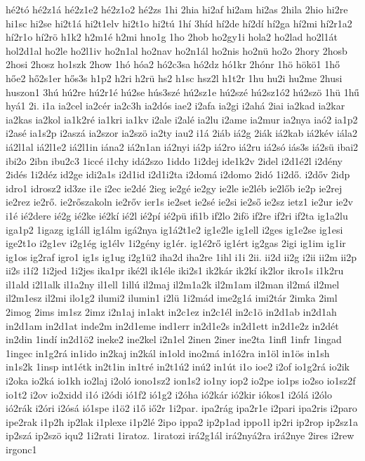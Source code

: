 {hé2tó
hé2z1á
hé2z1e2
hé2z1o2
hé2zs
1hi
2hia
hi2af
hi2am
hi2as
2hila
2hio
hi2re
hi1sc
hi2se
hi2t1á
hi2t1elv
hi2t1o
hi2tú
1hí
3híd
hí2de
hí2dí
hí2ga
hí2mi
hí2r1a2
hí2r1o
hí2rö
h1k2
h2m1é
h2mi
hno1g
1ho
2hob
ho2gy1i
hola2
ho2lad
ho2l1át
hol2d1al
ho2le
ho2l1iv
ho2n1al
ho2nav
ho2n1ál
ho2nis
ho2nü
ho2o
2hory
2hosb
2hosi
2hosz
ho1szk
2how
1hó
hóa2
hó2c3sa
hó2dz
hó1kr
2hónr
1hö
hökö1
1hő
hőe2
hő2s1er
hős3s
h1p2
h2ri
h2rü
hs2
h1sc
hsz2l
h1t2r
1hu
hu2i
hu2me
2husi
huszon1
3hú
hú2re
hú2r1é
hú2se
hús3szé
hú2sz1e
hú2szé
hú2sz1ó2
hú2szö
1hü
1hű
hyá1
2i.
i1a
ia2cel
ia2cér
ia2c3h
ia2dós
iae2
i2afa
ia2gi
i2ahá
2iai
ia2kad
ia2kar
ia2kas
ia2kol
ia1k2ré
ia1kri
ia1kv
i2ale
i2alé
ia2lu
i2ame
ia2mur
ia2nya
iaó2
ia1p2
i2asé
ia1s2p
i2aszá
ia2szor
ia2szö
ia2ty
iau2
i1á
2iáb
iá2g
2iák
iá2kab
iá2kév
iála2
iá2l1al
iá2l1e2
iá2l1in
iána2
iá2n1an
iá2nyi
iá2p
iá2ro
iá2ru
iá2só
iás3s
iá2sü
ibai2
ibi2o
2ibn
ibu2c3
1iccé
i1chy
idá2szo
1iddo
1i2dej
ide1k2v
2idel
i2d1é2l
i2dény
2idés
1i2déz
id2ge
idi2a1s
i2d1id
i2d1i2ta
i2domá
i2domo
2idó
1i2dő.
i2dőv
2idp
idro1
idrosz2
id3ze
i1e
i2ec
ie2dé
2ieg
ie2gé
ie2gy
ie2le
ie2léb
ie2lőb
ie2p
ie2rej
ie2rez
ie2rő.
ie2rőszakoln
ie2rőv
ier1s
ie2set
ie2sé
ie2si
ie2ső
ie2sz
ietz1
ie2ur
ie2v
i1é
ié2dere
ié2g
ié2ke
ié2kí
ié2l
ié2pí
ié2pü
ifi1b
if2lo
2ifö
if2re
if2ri
if2ta
ig1a2lu
iga1p2
1igazg
ig1áll
ig1álm
igá2nya
ig1á2t1e2
ig1e2le
ig1ell
i2ges
ig1e2se
ig1esi
ige2t1o
i2g1ev
i2g1ég
ig1élv
1i2gény
ig1ér.
ig1é2rő
ig1ért
ig2gas
2igi
ig1im
ig1ir
ig1os
ig2raf
igro1
ig1s
ig1ug
i2g1ü2
iha2d
iha2re
1ihl
i1i
2ii.
ii2d
ii2g
i2ii
ii2m
ii2p
ii2s
i1í2
1i2jed
1i2jes
ika1pr
iké2l
ik1éle
iki2s1
ik2kár
ik2kí
ik2lor
ikro1s
i1k2ru
il1ald
i2l1alk
il1a2ny
il1ell
1illú
il2maj
il2m1a2k
il2m1am
il2man
il2má
il2mel
il2m1esz
il2mi
ilo1g2
ilumi2
ilumin1
i2lü
1i2mád
ime2g1á
imi2tár
2imka
2iml
2imog
2ims
im1sz
2imz
i2n1aj
in1akt
in2c1ez
in2c1él
in2c1ö
in2d1ab
in2d1ah
in2d1am
in2d1at
inde2m
in2d1eme
ind1err
in2d1e2s
in2d1ett
in2d1e2z
in2dét
in2din
1indí
in2d1ö2
ineke2
ine2kel
i2n1el
2inen
2iner
ine2ta
1infl
1infr
1ingad
1ingec
in1g2rá
in1ido
in2kaj
in2kál
in1old
ino2má
in1ó2ra
in1öl
in1ös
in1sh
in1s2k
1insp
int1étk
in2t1in
in1tré
in2t1ú2
inú2
in1út
i1o
ioe2
i2of
io1g2rá
io2ik
i2oka
io2ká
io1kh
io2laj
i2oló
iono1sz2
ion1s2
io1ny
iop2
io2pe
io1ps
io2so
io1sz2f
io1t2
i2ov
io2xidd
i1ó
i2ódi
ió1f2
ió1g2
i2óha
ió2kár
ió2kir
iókos1
i2ólá
i2ólo
ió2rák
i2óri
i2ósá
ió1spe
i1ö2
i1ő
iő2r
1i2par.
ipa2rág
ipa2r1e
i2pari
ipa2ris
i2paro
ipe2rak
i1p2h
ip2lak
i1plexe
i1p2lé
2ipo
ippa2
ip2p1ad
ippo1l
ip2ri
ip2rop
ip2sz1a
ip2szá
ip2szö
iqu2
1i2rati
1iratoz.
1iratozi
irá2g1ál
irá2nyá2ra
irá2nye
2ires
i2rew
irgonc1
}

